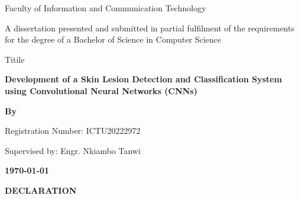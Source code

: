 
\begin{titlepage}
    \centering
    
    
    \vspace{1cm}
    
    {\Large Faculty of Information and Communication Technology}
    
    \vspace{1.2cm}
    
    {A dissertation presented and submitted in partial fulfilment of the requirements\\
    for the degree of a Bachelor of Science in Computer Science}
    
    \vspace{0.5cm}

    {Titile}
    
    \textbf{Development of a Skin Lesion Detection and Classification System using Convolutional Neural Networks (CNNs)}
    
    \vspace{0.4cm}
    
    \textbf{By}
    
    
    \vspace{0.5cm}
    
    {Registration Number: ICTU20222972}
    
    \vspace{1cm}
    
    {Supervised by: Engr. Nkiambo Tanwi}
    
    \vspace{2cm}
    
    \textbf{\today}
    
    \vfill
\end{titlepage}
\clearpage
\thispagestyle{empty}
\begin{center}
\textbf{\large DECLARATION}
\end{center}

